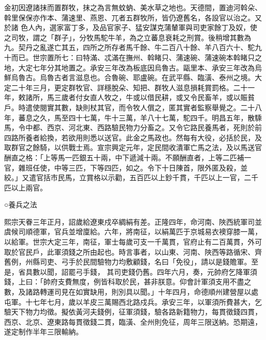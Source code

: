 \begin{pinyinscope}
 金初因遼諸抹而置群牧，抹之為言無蚊蚋、美水草之地也。天德間，置迪河斡朵、斡里保保亦作本、蒲速里、燕恩、兀者五群牧所，皆仍遼舊名，各設官以治之。又於諸
 色人內，選家富丁多，及品官家子、猛安謀克蒲輦軍與司吏家餘丁及奴，使之司牧，謂之「群子」，分牧馬駝牛羊，為之立蕃息衰耗之刑賞。後稍增其數為九。契丹之亂遂亡其五，四所之所存者馬千餘、牛二百八十餘、羊八百六十、駝九十而已。世宗置所七：曰特滿、忒滿在撫州、斡睹只、蒲速碗、蒲速碗本斡睹只之地，大定七年分其地置之。承安三年改為板底因烏魯古。甌里本、承安三年改為烏鮮烏魯古。烏魯古者言滋息也。合魯碗、耶盧碗。在武平縣、臨潢、泰州之境。大定二十年三月，更定群牧官、詳穩脫朵、知把、群牧人滋息損耗賞罰格。二十一年，敕諸所，馬三歲者付女直人牧之，牛或以借民耕，或又令民畜羊，或以賑貧
 戶。時遣使閱實其數，缺則杖其官，而令牧人償之，匿其實者監察舉覺之。二十八年，蕃息之久，馬至四十七萬，牛十三萬，羊八十七萬，駝四千。明昌五年，散騬馬，令中都、西京、河北東、西路驗民物力分畜之。又令它路民養馬者，死則於前四路所養者給換，若欲用則悉以送官。此金之馬政也。然每有大役，必括於民，及取群官之餘騎，以供戰士焉。宣宗興定元年，定民間收潰軍亡馬之法，及以馬送官酬直之格：「上等馬一匹銀五十兩，中下遞減十兩。不願酬直者，上等二匹補一官，雜班任使，中等三匹，下等四匹，如之。令下十日陳首，限外匿及殺，並
 絞。」又遣官括市民馬，立賞格以示勸，五百匹以上鈔千貫，千匹以上一官，二千匹以上兩官。



 ○養兵之法



 熙宗天眷三年正月，詔歲給遼東戍卒綢絹有差。正隆四年，命河南、陜西統軍司並虞候司順德軍，官兵並增廩給。六年，將南征，以絹萬匹于京城易衣襖穿膝一萬，以給軍。世宗大定三年，南征，軍士每歲可支一千萬貫，官府止有二百萬貫，外可取於官民戶，此軍須錢之所由起也。時言事者，以山東、河南、陜西等路循宋、齊舊例，州縣司吏、弓手於民間驗物力均敷顧錢，名曰「免役」，請以是錢贍軍。至是，省具數以聞，詔罷弓手錢，
 其司吏錢仍舊。四年六月，奏，元帥府乞降軍須錢，上曰：「帥府支費無度，例皆科取於民，甚非朕意。仰會計軍須支用不盡之數，及諸路轉運司見在如實缺用，則別具以聞。」十年四月，命德順州建營屋以處屯軍。十七年七月，歲以羊皮三萬賜西北路戍兵。承安三年，以軍須所費甚大，乞驗天下物力均徵。擬依黃河夫錢例，征軍須錢，驗各路新籍物力，每貫徵錢四貫，西京、北京、遼東路每貫徵錢二貫，臨潢、全州則免征，周年三限送納。恐期遠，遂定制作半年三限輸納。




\end{pinyinscope}

